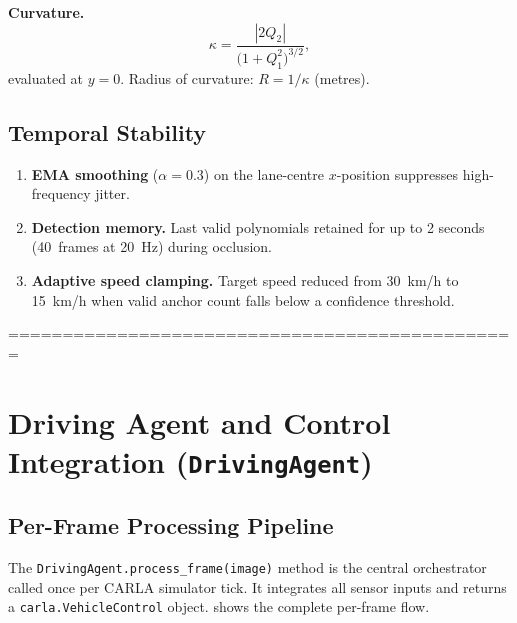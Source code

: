 \documentclass[12pt,a4paper]{article}
\begin{document}
\textbf{Curvature.}
\begin{equation}
  \kappa = \frac{|2Q_2|}{\bigl(1 + Q_1^2\bigr)^{3/2}},
  \label{eq:curvature}
\end{equation}
evaluated at $y=0$.  Radius of curvature: $R = 1/\kappa$ (metres).

\subsection{Temporal Stability}
\label{subsec:lane_temporal}

\begin{enumerate}[nosep, label=\textbf{\arabic*.}]
  \item \textbf{EMA smoothing} ($\alpha=0.3$) on the lane-centre
        $x$-position suppresses high-frequency jitter.
  \item \textbf{Detection memory.}  Last valid polynomials retained for up
        to 2 seconds (\SI{40}{frames} at \SI{20}{\hertz}) during occlusion.
  \item \textbf{Adaptive speed clamping.}  Target speed reduced from
        \SI{30}{km/h} to \SI{15}{km/h} when valid anchor count falls below
        a confidence threshold.
\end{enumerate}
===============================================
\section{Driving Agent and Control Integration (\texttt{DrivingAgent})}
\label{sec:agent}

\subsection{Per-Frame Processing Pipeline}
\label{subsec:process_frame}

The \texttt{DrivingAgent.process\_frame(image)} method is the central
orchestrator called once per CARLA simulator tick.  It integrates all sensor
inputs and returns a \texttt{carla.VehicleControl} object.
 shows the complete per-frame flow.
\end{document}
